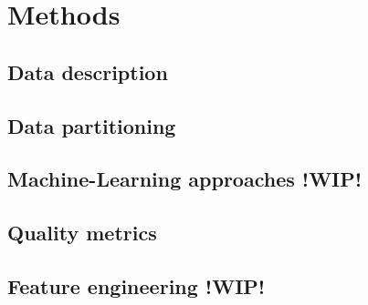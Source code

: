 \chapter{Methods}
\label{cha:Methods}


\section{Data description}



\section{Data partitioning}


\section{Machine-Learning approaches !WIP!}


\section{Quality metrics}


% 

\section{Feature engineering !WIP!}
